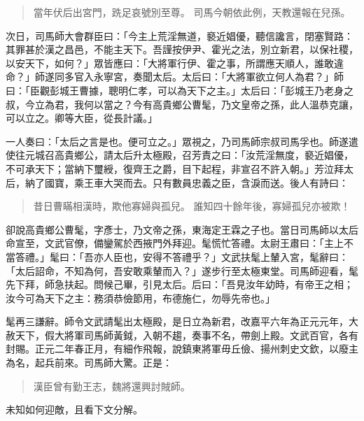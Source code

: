 \begin{quote}
當年伏后出宮門，跣足哀號別至尊。
司馬今朝依此例，天教還報在兒孫。
\end{quote}

次日，司馬師大會群臣曰：「今主上荒淫無道，褻近娼優，聽信讒言，閉塞賢路：其罪甚於漢之昌邑，不能主天下。吾謹按伊尹、霍光之法，別立新君，以保社稷，以安天下，如何？」眾皆應曰：「大將軍行伊、霍之事，所謂應天順人，誰敢違命？」師遂同多官入永寧宮，奏聞太后。太后曰：「大將軍欲立何人為君？」師曰：「臣觀彭城王曹據，聰明仁孝，可以為天下之主。」太后曰：「彭城王乃老身之叔，今立為君，我何以當之？今有高貴鄉公曹髦，乃文皇帝之孫，此人溫恭克讓，可以立之。卿等大臣，從長計議。」

一人奏曰：「太后之言是也。便可立之。」眾視之，乃司馬師宗叔司馬孚也。師遂遣使往元城召高貴鄉公，請太后升太極殿，召芳責之曰：「汝荒淫無度，褻近娼優，不可承天下；當納下璽綬，復齊王之爵，目下起程，非宣召不許入朝。」芳泣拜太后，納了國寶，乘王車大哭而去。只有數員忠義之臣，含淚而送。後人有詩曰：

\begin{quote}
昔日曹瞞相漢時，欺他寡婦與孤兒。
誰知四十餘年後，寡婦孤兒亦被欺！
\end{quote}

卻說高貴鄉公曹髦，字彥士，乃文帝之孫，東海定王霖之子也。當日司馬師以太后命宣至，文武官僚，備鑾駕於西掖門外拜迎。髦慌忙答禮。太尉王肅曰：「主上不當答禮。」髦曰：「吾亦人臣也，安得不答禮乎？」文武扶髦上輦入宮，髦辭曰：「太后詔命，不知為何，吾安敢乘輦而入？」遂步行至太極東堂。司馬師迎看，髦先下拜，師急扶起。問候己畢，引見太后。后曰：「吾見汝年幼時，有帝王之相；汝今可為天下之主：務須恭儉節用，布德施仁，勿辱先帝也。」

髦再三謙辭。師令文武請髦出太極殿，是日立為新君，改嘉平六年為正元元年，大赦天下，假大將軍司馬師黃鉞，入朝不趨，奏事不名，帶劍上殿。文武百官，各有封賜。正元二年春正月，有細作飛報，說鎮東將軍毋丘儉、揚州刺史文欽，以廢主為名，起兵前來。司馬師大驚。正是：

\begin{quote}
漢臣曾有勤王志，魏將還興討賊師。
\end{quote}

未知如何迎敵，且看下文分解。
